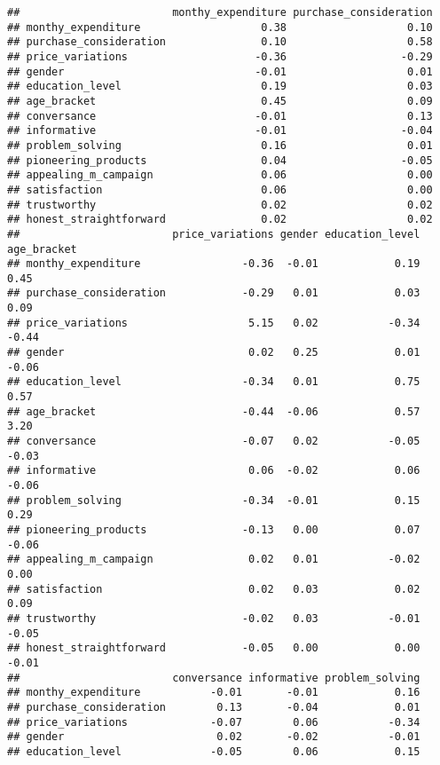 \documentclass[
]{article}
\begin{document}
\begin{verbatim}
##                        monthy_expenditure purchase_consideration
## monthy_expenditure                   0.38                   0.10
## purchase_consideration               0.10                   0.58
## price_variations                    -0.36                  -0.29
## gender                              -0.01                   0.01
## education_level                      0.19                   0.03
## age_bracket                          0.45                   0.09
## conversance                         -0.01                   0.13
## informative                         -0.01                  -0.04
## problem_solving                      0.16                   0.01
## pioneering_products                  0.04                  -0.05
## appealing_m_campaign                 0.06                   0.00
## satisfaction                         0.06                   0.00
## trustworthy                          0.02                   0.02
## honest_straightforward               0.02                   0.02
##                        price_variations gender education_level age_bracket
## monthy_expenditure                -0.36  -0.01            0.19        0.45
## purchase_consideration            -0.29   0.01            0.03        0.09
## price_variations                   5.15   0.02           -0.34       -0.44
## gender                             0.02   0.25            0.01       -0.06
## education_level                   -0.34   0.01            0.75        0.57
## age_bracket                       -0.44  -0.06            0.57        3.20
## conversance                       -0.07   0.02           -0.05       -0.03
## informative                        0.06  -0.02            0.06       -0.06
## problem_solving                   -0.34  -0.01            0.15        0.29
## pioneering_products               -0.13   0.00            0.07       -0.06
## appealing_m_campaign               0.02   0.01           -0.02        0.00
## satisfaction                       0.02   0.03            0.02        0.09
## trustworthy                       -0.02   0.03           -0.01       -0.05
## honest_straightforward            -0.05   0.00            0.00       -0.01
##                        conversance informative problem_solving
## monthy_expenditure           -0.01       -0.01            0.16
## purchase_consideration        0.13       -0.04            0.01
## price_variations             -0.07        0.06           -0.34
## gender                        0.02       -0.02           -0.01
## education_level              -0.05        0.06            0.15

\end{verbatim}
\end{document}
